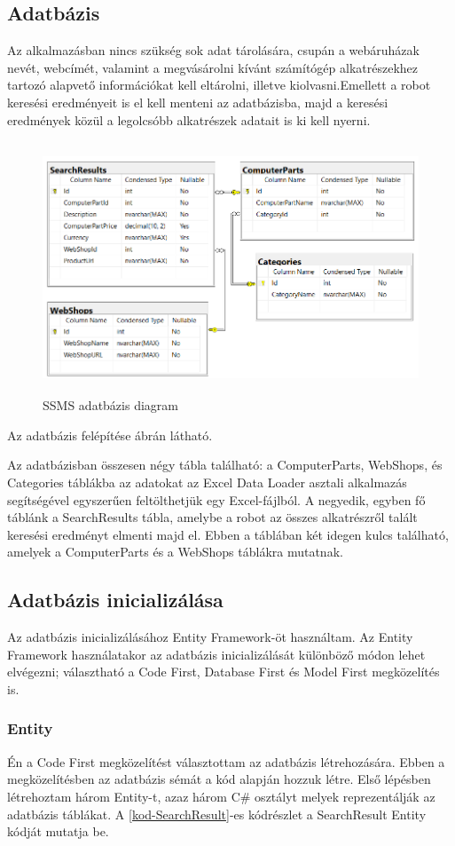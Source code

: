 \documentclass[
]{thesis-ekf}
\theoremstyle{definition}
\theoremstyle{remark}
\begin{document}
\subsection{Adatbázis}
Az alkalmazásban nincs szükség sok adat tárolására, csupán a webáruházak nevét, webcímét, valamint a megvásárolni kívánt számítógép alkatrészekhez tartozó alapvető információkat kell eltárolni, illetve kiolvasni.Emellett a robot keresési eredményeit is el kell menteni az adatbázisba, majd a keresési eredmények közül a legolcsóbb alkatrészek adatait is ki kell nyerni.
	\begin{figure}[!ht]
		\centering
		\includegraphics[width=15cm, height=7.5cm]{entity_diagram}
		\caption{SSMS adatbázis diagram}
		\label{picture-adatbazis}
	\end{figure}
Az adatbázis felépítése  ábrán látható. 

Az adatbázisban összesen négy tábla található: a ComputerParts, WebShops, és Categories táblákba az adatokat az Excel Data Loader asztali alkalmazás segítségével egyszerűen feltölthetjük egy Excel-fájlból.
A negyedik, egyben fő táblánk a SearchResults tábla, amelybe a robot az összes alkatrészről talált keresési eredményt elmenti majd el. Ebben a táblában két idegen kulcs található, amelyek a ComputerParts és a WebShops táblákra mutatnak.
\subsection{Adatbázis inicializálása}
Az adatbázis inicializálásához Entity Framework-öt használtam. Az Entity Framework használatakor az adatbázis inicializálását különböző módon lehet elvégezni; választható a Code First, Database First és Model First megközelítés is.
\subsubsection{Entity}
Én a Code First megközelítést választottam az adatbázis létrehozására. Ebben a megközelítésben az adatbázis sémát a kód alapján hozzuk létre. Első lépésben létrehoztam három Entity-t, azaz három C\# osztályt melyek reprezentálják az adatbázis táblákat. A \ref{kod-SearchResult}-es kódrészlet a SearchResult Entity kódját mutatja be.
\end{document}
